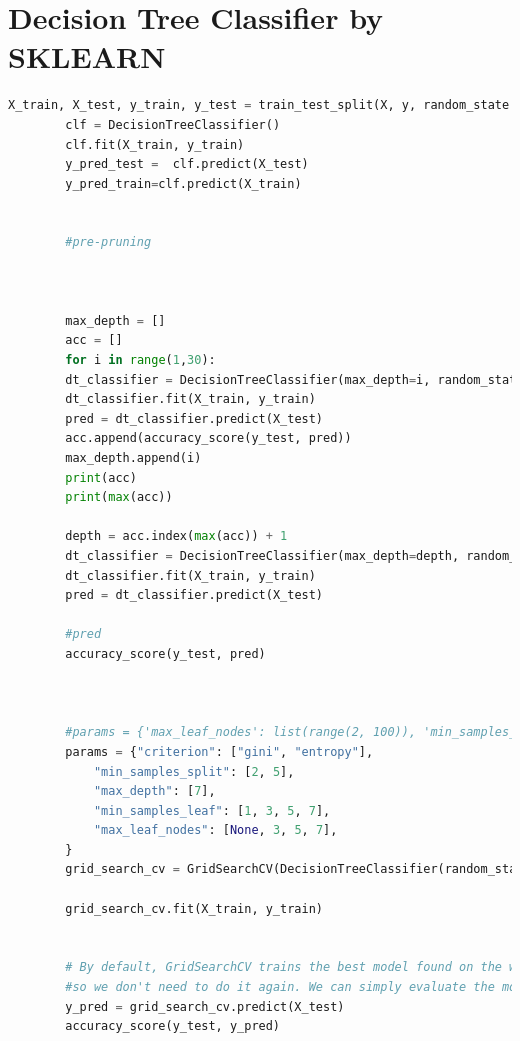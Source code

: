\documentclass{article}
\begin{document}
	\section{Decision Tree Classifier by SKLEARN}
	\begin{lstlisting}[language=Python]
		X_train, X_test, y_train, y_test = train_test_split(X, y, random_state = 20, train_size = 0.7)
		clf = DecisionTreeClassifier()
		clf.fit(X_train, y_train)
		y_pred_test =  clf.predict(X_test)
		y_pred_train=clf.predict(X_train)
		
		
		#pre-pruning
		
		
		
		max_depth = []
		acc = []
		for i in range(1,30):
		dt_classifier = DecisionTreeClassifier(max_depth=i, random_state = 30)
		dt_classifier.fit(X_train, y_train)
		pred = dt_classifier.predict(X_test)
		acc.append(accuracy_score(y_test, pred))
		max_depth.append(i)
		print(acc)
		print(max(acc))
		
		depth = acc.index(max(acc)) + 1
		dt_classifier = DecisionTreeClassifier(max_depth=depth, random_state = 20)
		dt_classifier.fit(X_train, y_train)
		pred = dt_classifier.predict(X_test)
		
		#pred
		accuracy_score(y_test, pred)
		
		
		
		#params = {'max_leaf_nodes': list(range(2, 100)), 'min_samples_split': [2, 3, 4]}
		params = {"criterion": ["gini", "entropy"],
			"min_samples_split": [2, 5],
			"max_depth": [7],
			"min_samples_leaf": [1, 3, 5, 7],
			"max_leaf_nodes": [None, 3, 5, 7],
		}
		grid_search_cv = GridSearchCV(DecisionTreeClassifier(random_state=20), params,cv=3, scoring='accuracy')
		
		grid_search_cv.fit(X_train, y_train)
		
		
		# By default, GridSearchCV trains the best model found on the whole training set (you can change this by setting refit=False), 
		#so we don't need to do it again. We can simply evaluate the model's accuracy:
		y_pred = grid_search_cv.predict(X_test)
		accuracy_score(y_test, y_pred)
		
	\end{lstlisting}
	
\end{document}
